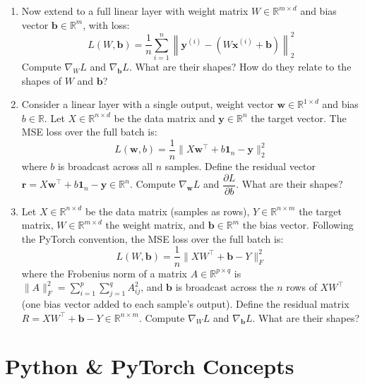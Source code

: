 \documentclass[12pt, a4paper]{scrartcl}
\begin{document}
\begin{enumerate}
Compute
    $\nabla_\mathbf{w} L$ and $\dfrac{\partial L}{\partial b}$. What is the
    shape of $\nabla_\mathbf{w} L$?

    \item Now extend to a full linear layer with weight matrix $W \in
    \mathbb{R}^{m \times d}$ and bias vector $\mathbf{b} \in \mathbb{R}^m$,
    with loss:
    \[
    L(W, \mathbf{b}) = \frac{1}{n}\sum_{i=1}^{n}
    \left\|\mathbf{y}^{(i)} - \left(W\mathbf{x}^{(i)} + \mathbf{b}\right)\right\|_2^2
    \]
    Compute $\nabla_W L$ and $\nabla_\mathbf{b} L$. What
    are their shapes? How do they relate to the shapes of $W$ and $\mathbf{b}$?

    \item Consider a linear layer with a single output, weight vector $\mathbf{w}
    \in \mathbb{R}^{1 \times d}$ and bias $b \in \mathbb{R}$. Let $X \in
    \mathbb{R}^{n \times d}$ be the data matrix and $\mathbf{y} \in \mathbb{R}^{n}$
    the target vector. The MSE loss over the full batch is:
    \[
        L(\mathbf{w}, b) = \frac{1}{n}\|X\mathbf{w}^\top + b\mathbf{1}_n - \mathbf{y}\|_2^2
    \]
    where $b$ is broadcast across all $n$ samples. Define the residual vector
    $\mathbf{r} = X\mathbf{w}^\top + b\mathbf{1}_n - \mathbf{y} \in
    \mathbb{R}^{n}$. Compute $\nabla_\mathbf{w} L$ and $\dfrac{\partial
    L}{\partial b}$. What are their shapes?

    \item Let $X \in \mathbb{R}^{n \times d}$ be the data matrix (samples as
    rows), $Y \in \mathbb{R}^{n \times m}$ the target matrix, $W \in
    \mathbb{R}^{m \times d}$ the weight matrix, and $\mathbf{b} \in \mathbb{R}^m$
    the bias vector. Following the PyTorch convention, the MSE loss over the
    full batch is:
    \[
        L(W, \mathbf{b}) = \frac{1}{n}\|XW^\top + \mathbf{b} - Y\|_F^2
    \]
    where the Frobenius norm of a matrix $A \in \mathbb{R}^{p \times q}$ is
    $\|A\|_F^2 = \sum_{i=1}^{p}\sum_{j=1}^{q} A_{ij}^2$, and $\mathbf{b}$ is
    broadcast across the $n$ rows of $XW^\top$ (one bias vector added to each
    sample's output). Define the residual matrix $R = XW^\top + \mathbf{b} - Y
    \in \mathbb{R}^{n \times m}$. Compute $\nabla_W L$ and $\nabla_\mathbf{b}
    L$. What are their shapes?

\end{enumerate}


\section{Python \& PyTorch Concepts}
\end{document}
